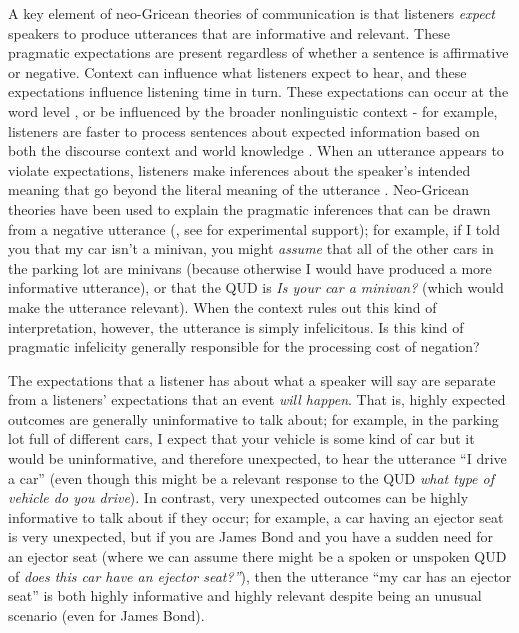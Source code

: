 \documentclass[man, floatsintext, noapacite]{apa6}
\begin{document}
A key element of neo-Gricean theories of communication is that listeners \textit{expect} speakers to produce utterances that are informative and relevant. These pragmatic expectations are present regardless of whether a sentence is affirmative or negative. Context can influence what listeners expect to hear, and these expectations influence listening time in turn. These expectations can occur at the word level \cite{hale2001, levy2008}, or be influenced by the broader nonlinguistic context - for example, listeners are faster to process sentences about expected information based on both the discourse context and world knowledge \cite{hald2007, lemke2021}. When an utterance appears to violate expectations, listeners make inferences about the speaker's intended meaning that go beyond the literal meaning of the utterance \cite{kravtchenko2022}. Neo-Gricean theories have been used to explain the pragmatic inferences that can be drawn from a negative utterance (, see  for experimental support); for example, if I told you that my car isn't a minivan, you might \textit{assume} that all of the other cars in the parking lot are minivans (because otherwise I would have produced a more informative utterance), or that the QUD is \textit{Is your car a minivan?} (which would make the utterance relevant).  When the context rules out this kind of interpretation, however, the utterance is simply infelicitous. Is this kind of pragmatic infelicity generally responsible for the processing cost of negation?

The expectations that a listener has about what a speaker will say are separate from a listeners' expectations that an event \textit{will happen}. That is, highly expected outcomes are generally uninformative to talk about; for example, in the parking lot full of different cars, I expect that your vehicle is some kind of car but it would be uninformative, and therefore unexpected, to hear the utterance ``I drive a car'' (even though this might be a relevant response to the QUD \textit{what type of vehicle do you drive}). In contrast, very unexpected outcomes can be highly informative to talk about if they occur; for example, a car having an ejector seat is very unexpected, but if you are James Bond and you have a sudden need for an ejector seat (where we can assume there might be a spoken or unspoken QUD of \textit{does this car have an ejector seat?''}), then the utterance ``my car has an ejector seat'' is both highly informative and highly relevant despite being an unusual scenario (even for James Bond). 
\end{document}
